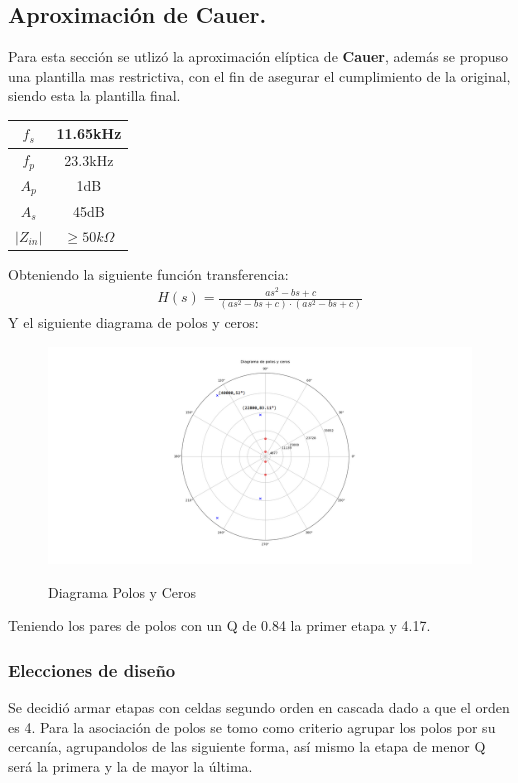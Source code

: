 \subsection{Aproximación de Cauer.}
Para esta sección se utlizó la aproximación elíptica de \textbf{Cauer}, además se propuso una plantilla mas restrictiva, con el fin de asegurar el cumplimiento de la original, siendo esta la plantilla final.
\begin{table}[H]
\centering
\begin{tabular}{|c|c|}
\hline
$f_s$      & 11.65kHz          \\ \hline
$f_p$      & 23.3kHz           \\ \hline
$A_p$      & 1dB               \\ \hline
$A_s$      & 45dB              \\ \hline
$|Z_{in}|$ & $\geq 50k \Omega$ \\ \hline
\end{tabular}
\end{table}
Obteniendo la siguiente función transferencia:
\begin{align}
	H(s)=\frac{as^2-bs+c}{(as^2-bs+c)\cdot (as^2-bs+c)}
\end{align}
Y el siguiente diagrama de polos y ceros:
\begin{figure}[H]
	\centering
	\includegraphics[width=\textwidth]{Imagenes-Ej3/DiagramaPolosYCeros.png}
	\label{fig:stepresponse}
	\caption{Diagrama Polos y Ceros}
\end{figure}

Teniendo los pares de polos con un Q de 0.84 la primer etapa y 4.17.

\subsubsection{Elecciones de diseño}
Se decidió armar etapas con celdas segundo orden en cascada dado a que el orden es 4.
Para la asociación de polos se tomo como criterio agrupar los polos por su cercanía, agrupandolos de las siguiente forma, así mismo la etapa de menor Q será la primera y la de mayor la última.
